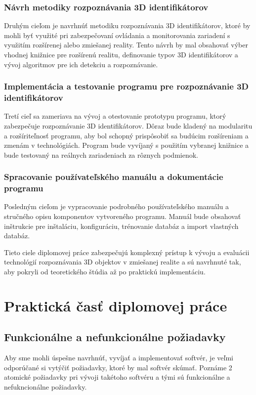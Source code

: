 \subsubsection{Návrh metodiky rozpoznávania 3D identifikátorov}
Druhým cieľom je navrhnúť metodiku rozpoznávania 3D identifikátorov, ktoré by mohli byť využité pri zabezpečovaní ovládania a monitorovania zariadení s využitím rozšírenej alebo zmiešanej reality. Tento návrh by mal obsahovať výber vhodnej knižnice pre rozšírenú realitu, definovanie typov 3D identifikátorov a vývoj algoritmov pre ich detekciu a rozpoznávanie.

\subsubsection{Implementácia a testovanie programu pre rozpoznávanie 3D identifikátorov}
Tretí cieľ sa zameriava na vývoj a otestovanie prototypu programu, ktorý zabezpečuje rozpoznávanie 3D identifikátorov. Dôraz bude kladený na modularitu a rozšíriteľnosť programu, aby bol schopný prispôsobiť sa budúcim rozšíreniam a zmenám v technológiách. Program bude vyvíjaný s použitím vybranej knižnice a bude testovaný na reálnych zariadeniach za rôznych podmienok.

\subsubsection{Spracovanie používateľského manuálu a dokumentácie programu}
Posledným cieľom je vypracovanie podrobného používateľského manuálu a stručného opisu komponentov vytvoreného programu. Manuál bude obsahovať inštrukcie pre inštaláciu, konfiguráciu, trénovanie databáz a import vlastných databáz.

Tieto ciele diplomovej práce zabezpečujú komplexný prístup k vývoju a evaluácii technológií rozpoznávania 3D objektov v zmiešanej realite a sú navrhnuté tak, aby pokryli od teoretického štúdia až po praktickú implementáciu.

\section{Praktická časť diplomovej práce}

\subsection{Funkcionálne a nefunkcionálne požiadavky}

Aby sme mohli úspešne navrhnúť, vyvíjať a implementovať softvér, je veľmi odporúčané si vytýčiť požiadavky, ktoré by mal softvér skúmať. Poznáme 2 atomické požiadavky pri vývoji takétoho softvéru a tými sú funkcionálne a nefukncionálne požiadavky. 

